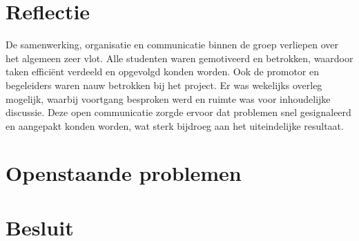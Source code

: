 \documentclass[12pt,a4paper,faculty=ea,language=nl]{ugent-doc}
\begin{document}
\section{Reflectie}
De samenwerking, organisatie en communicatie binnen de groep verliepen over het algemeen zeer vlot. Alle studenten waren gemotiveerd en betrokken, waardoor taken efficiënt verdeeld en opgevolgd konden worden. Ook de promotor en begeleiders waren nauw betrokken bij het project. Er was wekelijks overleg mogelijk, waarbij voortgang besproken werd en ruimte was voor inhoudelijke discussie. Deze open communicatie zorgde ervoor dat problemen snel gesignaleerd en aangepakt konden worden, wat sterk bijdroeg aan het uiteindelijke resultaat.
\section{Openstaande problemen}




\section{Besluit}


\newpage
\end{document}
